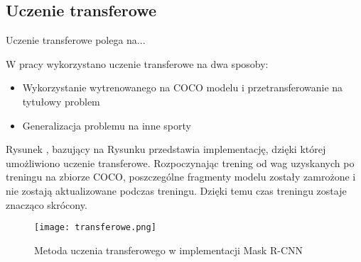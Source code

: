 \subsection{Uczenie transferowe}
\label{sec:uczenie-transferowe}

Uczenie transferowe polega na...

W pracy wykorzystano uczenie transferowe na dwa sposoby:

\begin{itemize}
	\item Wykorzystanie wytrenowanego na COCO modelu i przetransferowanie na tytułowy problem
	\item Generalizacja problemu na inne sporty
\end{itemize}

Rysunek , bazujący na Rysunku  przedstawia implementację, dzięki której umożliwiono uczenie transferowe. Rozpoczynając trening od wag uzyskanych po treningu na zbiorze COCO, poszczególne fragmenty modelu zostały zamrożone i nie zostają aktualizowane podczas treningu. Dzięki temu czas treningu zostaje znacząco skrócony.

\begin{figure}[h]
  \centering
  \caption{Metoda uczenia transferowego w implementacji Mask R-CNN}
  \texttt{[image: transferowe.png]}
  \label{fig:transferowe}
\end{figure}
